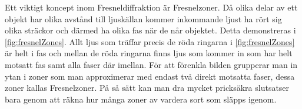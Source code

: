 \documentclass[a4paper]{article}
\begin{document}
Ett viktigt koncept inom Fresneldiffraktion är Fresnelzoner. Då olika delar av ett objekt har olika avstånd till ljuskällan kommer inkommande ljust ha rört sig olika sträckor och därmed ha olika fas när de når objektet. Detta demonstreras i \autoref{fig:fresnelZones}. Allt ljus som träffar precis de röda ringarna i \autoref{fig:fresnelZones} är helt i fas och mellan de röda ringarna finns ljus som kommer in som har helt motsatt fas samt alla faser där imellan. För att förenkla bilden grupperar man in ytan i zoner som man approximerar med endast två direkt motsatta faser, dessa zoner kallas Fresnelzoner. På så sätt kan man dra mycket pricksäkra slutsatser bara genom att räkna hur många zoner av vardera sort som släpps igenom.

\end{document}
